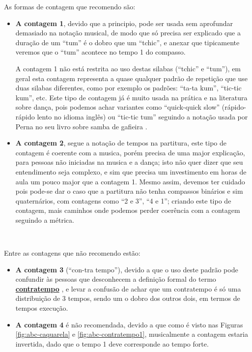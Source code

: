 As formas de contagem que recomendo são:
\begin{itemize}
\item \textbf{A contagem 1}, 
devido que a principio, pode ser usada sem aprofundar demasiado 
na notação musical, de modo que só precisa ser explicado que a duração de um 
``tum'' é o dobro que um ``tchic'', e anexar que tipicamente veremos que o ``tum''
acontece no tempo 1 do compasso.

A contagem 1 não está restrita ao uso destas silabas (``tchic'' e ``tum''), 
em geral esta contagem representa a quase qualquer padrão de repetição
que use duas silabas diferentes, como por exemplo os padrões: ``ta-ta kum'', ``tic-tic kum'', etc. 
Este tipo de contagem já é muito usada na prática e na literatura sobre dança, pois 
podemos achar variantes como ``quick-quick slow'' (rápido-rápido lento no idioma inglês)
ou ``tic-tic tum'' seguindo a notação usada por Perna no seu livro sobre samba de gafieira \cite[pp. 146]{perna2002samba}.
\item \textbf{A contagem 2}, segue a notação de tempos na partitura, este tipo de
contagem é coerente com a musica, porém precisa de uma major explicação, 
para pessoas não iniciadas na musica e a dança; isto não quer dizer que seu
entendimento seja complexo, e sim que precisa um investimento em horas de aula
um pouco major que a contagem 1.
Mesmo assim, devemos ter cuidado pois pode-se dar o caso que a partitura não tenha compassos binários 
e sim quaternários, com contagens como ``2 e 3'', ``4 e 1''; 
criando este tipo de contagem, mais caminhos onde podemos perder coerência com a contagem seguindo a métrica.
\end{itemize}~


Entre as contagens que não recomendo estão:
\begin{itemize}
\item \textbf{A contagem 3} (``con-tra tempo''), 
devido a que o uso deste padrão pode confundir às pessoas que desconhecem 
a definição formal do termo \hyperref[sec:contratempo]{\textbf{contratempo}} 
\cite[pp. 16]{mascarenhascurso} \cite[pp. 36]{azevedocompor}, 
e levar a confusão de achar que um contratempo é só uma distribuição de 3 tempos, 
sendo um o dobro dos outros dois, em termos de tempos execução.
\item \textbf{A contagem 4} é não recomendada, devido a que como é visto nas Figuras 
\ref{fig:abc-caquarela} e \ref{fig:abc-contratempo1}, musicalmente a contagem estaria invertida,
dado que o tempo 1 deve corresponde ao tempo forte.
\end{itemize}~

